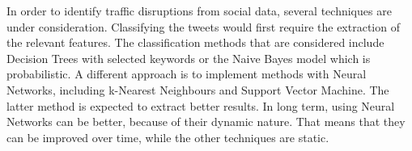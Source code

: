 In order to identify traffic disruptions from social data, several techniques are under consideration. Classifying the tweets would first require the extraction of the relevant features. The classification methods that are considered include Decision Trees with selected keywords or the Naive Bayes model which is probabilistic. A different approach is to implement methods with Neural Networks, including k-Nearest Neighbours and Support Vector Machine. The latter method is expected to extract better results. In long term, using Neural Networks can be better, because of their dynamic nature. That means that they can be improved over time, while the other techniques are static.
